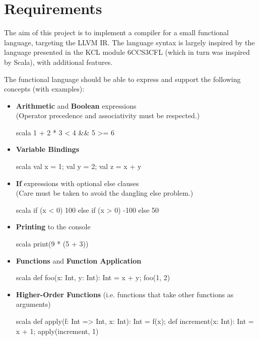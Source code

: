 \chapter{Requirements}
\label{ch:requirements}

The aim of this project is to implement a compiler for a small functional language, targeting the
LLVM IR. The language syntax is largely inspired by the language presented in the KCL module
6CCS3CFL (which in turn was inspired by Scala), with additional features.

The functional language should be able to express and support the following concepts (with
examples):

\begin{itemize}
    \item \textbf{Arithmetic} and \textbf{Boolean} expressions \\
          (Operator precedence and associativity must be respected.)
          \begin{code}{scala}
              1 + 2 * 3 < 4 && 5 >= 6
          \end{code}

    \item \textbf{Variable Bindings}
          \begin{code}{scala}
              val x = 1; val y = 2; val z = x + y
          \end{code}

    \item \textbf{If} expressions with optional else clauses \\
          (Care must be taken to avoid the dangling else problem.)
          \begin{code}{scala}
              if (x < 0) 100 else if (x > 0) -100 else 50
          \end{code}

    \item \textbf{Printing} to the console
          \begin{code}{scala}
              print(9 * (5 + 3))
          \end{code}

    \item \textbf{Functions} and \textbf{Function Application}
          \begin{code}{scala}
              def foo(x: Int, y: Int): Int = x + y;
              foo(1, 2)
          \end{code}

    \item \textbf{Higher-Order Functions} (i.e. functions that take other functions as arguments)
          \begin{code}{scala}
              def apply(f: Int => Int, x: Int): Int = f(x);
              def increment(x: Int): Int = x + 1;
              apply(increment, 1)
          \end{code}


\end{itemize}
